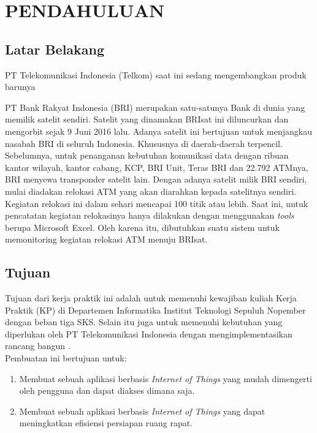 \chapter{PENDAHULUAN}

\section{Latar Belakang}
\tab PT Telekomunikasi Indonesia (Telkom) saat ini sedang mengembangkan produk barunya 



PT Bank Rakyat Indonesia (BRI) merupakan satu-satunya Bank di dunia yang memilik satelit sendiri. Satelit yang dinamakan BRIsat ini diluncurkan dan mengorbit sejak 9 Juni 2016 lalu. Adanya satelit ini bertujuan untuk menjangkau nasabah BRI di seluruh Indonesia. Khususnya di daerah-daerah terpencil.
\tab Sebelumnya, untuk penanganan kebutuhan komunikasi data dengan ribuan kantor wilayah, kantor cabang, KCP, BRI Unit, Teras BRI dan 22.792 ATMnya, BRI menyewa transponder satelit lain. Dengan adanya satelit milik BRI sendiri, mulai diadakan relokasi ATM yang akan diarahkan kepada satelitnya sendiri.\\
\tab Kegiatan relokasi ini dalam sehari mencapai 100 titik atau lebih. Saat ini, untuk pencatatan kegiatan relokasinya hanya dilakukan dengan menggunakan \textit{tools} berupa Microsoft Excel. Oleh karena itu, dibutuhkan suatu sistem untuk memonitoring kegiatan relokasi ATM menuju BRIsat\cite{bri}.

\section{Tujuan}
\tab Tujuan dari kerja praktik ini adalah untuk memenuhi kewajiban kuliah Kerja Praktik (KP) di Departemen Informatika Institut Teknologi Sepuluh Nopember dengan beban tiga SKS. Selain itu juga untuk memenuhi kebutuhan yang diperlukan oleh PT Telekomunikasi Indonesia dengan mengimplementasikan rancang bangun \sistem.\\ 
\tab Pembuatan \sistemSpasi ini bertujuan untuk:
\begin{enumerate}
	\item Membuat sebuah aplikasi berbasis \textit{Internet of Things} yang mudah dimengerti oleh pengguna dan dapat diakses dimana saja.
	\item Membuat sebuah aplikasi berbasis \textit{Internet of Things} yang dapat meningkatkan efisiensi persiapan ruang rapat.
\end{enumerate}

